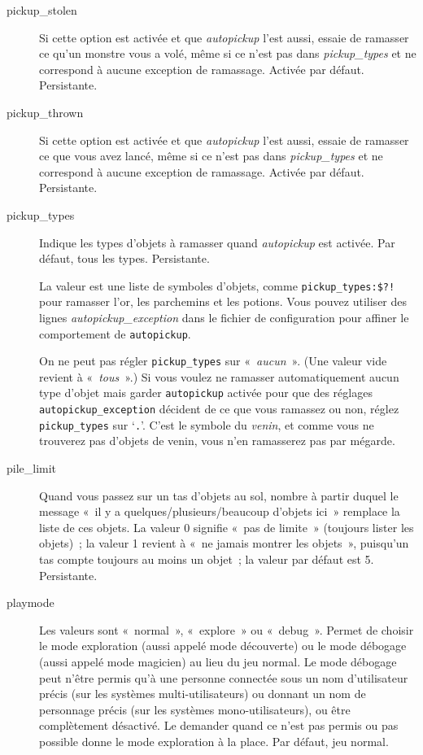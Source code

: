 \documentclass[titlepage]{article}
\begin{document}
\begin{description}
\item[{pickup\_stolen}]
Si cette option est activée et que
\textit{autopickup}
l'est aussi, essaie de ramasser ce qu'un monstre vous a volé, même si ce
n'est pas dans
\textit{pickup\_types}
et ne correspond à aucune exception de ramassage.
Activée par défaut.
Persistante.

\item[{pickup\_thrown}]
Si cette option est activée et que
\textit{autopickup}
l'est aussi, essaie de ramasser ce que vous avez lancé, même si ce n'est
pas dans
\textit{pickup\_types}
et ne correspond à aucune exception de ramassage.
Activée par défaut.
Persistante.

\item[{pickup\_types}]
Indique les types d'objets à ramasser quand
\textit{autopickup}
est activée.
Par défaut, tous les types.
Persistante.


La valeur est une liste de symboles d'objets, comme
\texttt{pickup\_types:\$?!} pour ramasser l'or, les parchemins et les potions.
Vous pouvez utiliser des lignes
\textit{autopickup\_exception}
dans le fichier de configuration pour affiner le comportement de
\texttt{autopickup}.


On ne peut pas régler \texttt{pickup\_types} sur «~\textit{aucun}~».
(Une valeur vide revient à «~\textit{tous}~».)
Si vous voulez ne ramasser automatiquement aucun type d'objet mais garder
\texttt{autopickup} activée pour que des réglages
\texttt{autopickup\_exception} décident de ce que vous ramassez ou non,
réglez \texttt{pickup\_types} sur `\texttt{.}'.
C'est le symbole du \textit{venin}, et comme vous ne trouverez pas d'objets de
venin, vous n'en ramasserez pas par mégarde.

\item[{pile\_limit}]
Quand vous passez sur un tas d'objets au sol, nombre à partir duquel le
message «~il y a quelques/plusieurs/beaucoup d'objets ici~» remplace
la liste de ces objets.
La valeur 0 signifie «~pas de limite~» (toujours lister les
objets)~; la valeur 1 revient à «~ne jamais montrer les objets~»,
puisqu'un tas compte toujours au moins un objet~; la valeur par défaut est
5.
Persistante.

\item[{playmode}]
Les valeurs sont «~normal~», «~explore~» ou «~debug~».
Permet de choisir le mode exploration (aussi appelé mode découverte) ou le
mode débogage (aussi appelé mode magicien) au lieu du jeu normal.
Le mode débogage peut n'être permis qu'à une personne connectée sous un
nom d'utilisateur précis (sur les systèmes multi-utilisateurs) ou donnant
un nom de personnage précis (sur les systèmes mono-utilisateurs), ou être
complètement désactivé.
Le demander quand ce n'est pas permis ou pas possible donne le mode
exploration à la place.
Par défaut, jeu normal.


\end{description}
\end{document}
